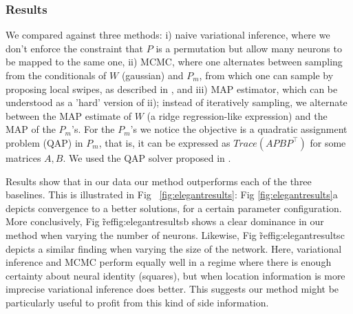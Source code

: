 \documentclass[twoside]{article}
\begin{document}
\subsubsection{Results}
We compared against three methods: i) naive variational inference, where we don't enforce the constraint that $P$ is a permutation but allow many neurons to be mapped to the same one, ii) MCMC, where one alternates between sampling from the conditionals of $W$ (gaussian) and $P_m$, from which one can sample by proposing local swipes, as described in \cite{Diaconis2009}, and iii) MAP estimator, which can be understood as a 'hard' version of ii); instead of iteratively sampling, we alternate between the MAP estimate of $W$ (a ridge regression-like expression) and the MAP of the $P_m$'s. For the $P_m$'s we notice the objective is a quadratic assignment problem (QAP) in $P_m$, that is, it can be expressed as $Trace(APBP^\top)$ for some matrices $A,B$. We used the QAP solver proposed in \cite{Vogelstein2015}. 

Results show that in our data our method outperforms each of the three baselines. This is illustrated in Fig ~\ref{fig:elegantresults}: Fig \ref{fig:elegantresults}a depicts convergence to a better solutions, for a certain parameter configuration. More conclusively, Fig \~ref{fig:elegantresults}b shows a clear dominance in our method when varying the number of neurons. Likewise, Fig \~ref{fig:elegantresults}c depicts a similar finding when varying the size of the network. Here, variational inference and MCMC perform equally well in a regime where there is enough certainty about neural identity (squares), but when location information is more imprecise variational inference does better. This suggests our method might be particularly useful to  profit from this kind of side information. 
\end{document}
